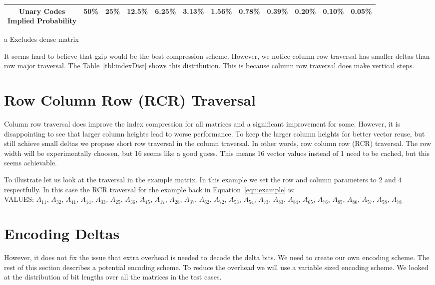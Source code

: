 \begin{sidewaystable}
\begin{threeparttable}
\begin{tabular}{cccccccccccc}
\hline
\shortstack{Unary Codes\\Implied Probability} & 50\% & 25\% & 12.5\% & 6.25\% & 3.13\% & 1.56\% & 0.78\% & 0.39\% & 0.20\% & 0.10\% & 0.05\% \\
\hline
\end{tabular}
\begin{tablenotes}
\item [a] Excludes dense matrix
\end{tablenotes}
\end{threeparttable}
\end{sidewaystable}%
It seems hard to believe that gzip would be the best compression scheme. However, we notice column row traversal has smaller deltas than row major traversal. The Table~\ref{tbl:indexDist} shows this distribution. This is because column row traversal does make vertical steps.
\section{Row Column Row (RCR) Traversal}
\par Column row traversal does improve the index compression for all matrices and a significant improvement for some. However, it is disappointing to see that larger column heights lead to worse performance. To keep the larger column heights for better vector reuse, but still achieve small deltas we propose short row traversal in the column traversal. In other words, row column row (RCR) traversal. The row width will be experimentally choosen, but 16 seems like a good guess. This means 16 vector values instead of 1 need to be cached, but this seems achievable.
\par To illustrate let us look at the traversal in the example matrix. In this example we set the row and column parameters to 2 and 4 respectfully. In this case the RCR traversal for the example back in Equation~\ref{eqn:example} is:\\
VALUES: $A_{11}$, $A_{32}$, $A_{41}$, $A_{14}$, $A_{33}$, $A_{25}$, $A_{36}$, $A_{45}$, $A_{17}$, $A_{28}$, $A_{37}$, $A_{62}$, $A_{72}$, $A_{53}$, $A_{54}$, $A_{73}$, $A_{83}$, $A_{84}$, $A_{65}$, $A_{76}$, $A_{85}$, $A_{86}$, $A_{57}$, $A_{58}$, $A_{78}$

\section{Encoding Deltas}
However, it does not fix the issue that extra overhead is needed to decode the delta bits. We need to create our own encoding scheme. The rest of this section describes a potential encoding scheme. To reduce the overhead we will use a variable sized encoding scheme. We looked at the distribution of bit lengths over all the matrices in the test cases. \par

